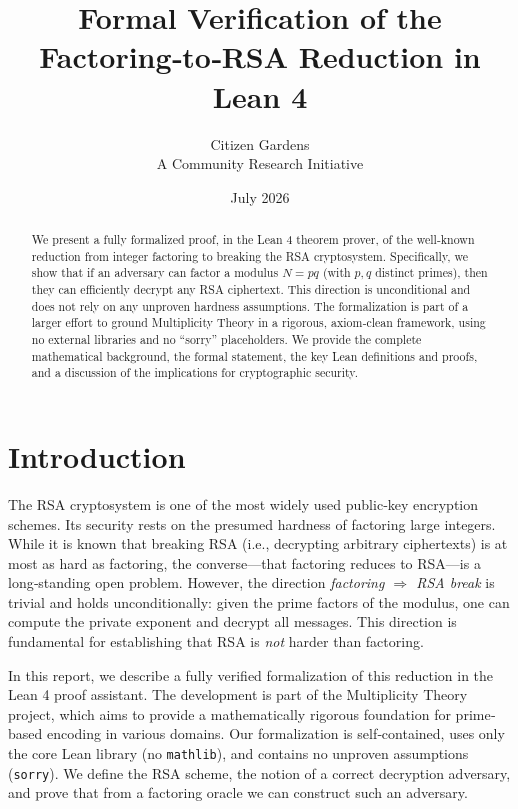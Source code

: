 \documentclass[12pt,a4paper]{article}
\title{Formal Verification of the Factoring‐to‐RSA Reduction in Lean 4}
\author{Citizen Gardens \\A Community Research Initiative}
\date{July 2026}
\begin{document}
\maketitle

\begin{abstract}
We present a fully formalized proof, in the Lean 4 theorem prover, of the well‐known reduction from integer factoring to breaking the RSA cryptosystem. Specifically, we show that if an adversary can factor a modulus \(N = p q\) (with \(p,q\) distinct primes), then they can efficiently decrypt any RSA ciphertext. This direction is unconditional and does not rely on any unproven hardness assumptions. The formalization is part of a larger effort to ground Multiplicity Theory in a rigorous, axiom‐clean framework, using no external libraries and no ``sorry'' placeholders. We provide the complete mathematical background, the formal statement, the key Lean definitions and proofs, and a discussion of the implications for cryptographic security.
\end{abstract}
\newpage
\section{Introduction}

The RSA cryptosystem \cite{RSA} is one of the most widely used public‐key encryption schemes. Its security rests on the presumed hardness of factoring large integers. While it is known that breaking RSA (i.e., decrypting arbitrary ciphertexts) is at most as hard as factoring, the converse—that factoring reduces to RSA—is a long‐standing open problem. However, the direction \emph{factoring \(\Rightarrow\) RSA break} is trivial and holds unconditionally: given the prime factors of the modulus, one can compute the private exponent and decrypt all messages. This direction is fundamental for establishing that RSA is \emph{not} harder than factoring.

In this report, we describe a fully verified formalization of this reduction in the Lean 4 proof assistant. The development is part of the Multiplicity Theory project, which aims to provide a mathematically rigorous foundation for prime‐based encoding in various domains. Our formalization is self‐contained, uses only the core Lean library (no \texttt{mathlib}), and contains no unproven assumptions (\texttt{sorry}). We define the RSA scheme, the notion of a correct decryption adversary, and prove that from a factoring oracle we can construct such an adversary.
\end{document}
